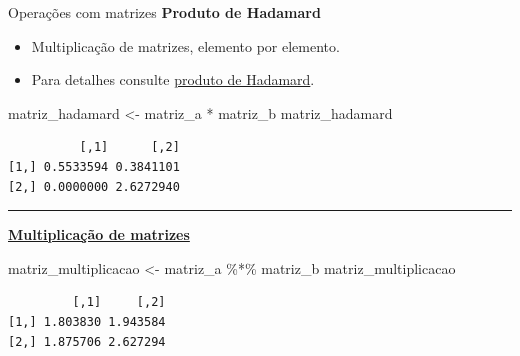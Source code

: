 \documentclass[
  10pt,
  ignorenonframetext,
]{beamer}
\newenvironment{Shaded}{\begin{snugshade}}{\end{snugshade}}
\newcommand{\NormalTok}[1]{\textcolor[rgb]{0.00,0.23,0.31}{#1}}
\newcommand{\OtherTok}[1]{\textcolor[rgb]{0.00,0.23,0.31}{#1}}
\newcommand{\SpecialCharTok}[1]{\textcolor[rgb]{0.37,0.37,0.37}{#1}}
\providecommand{\tightlist}{%
  \setlength{\itemsep}{0pt}\setlength{\parskip}{0pt}}\usepackage{longtable,booktabs,array}
\newcommand*{\regrafina}{\rule{\textwidth}{0.5pt}}
\begin{document}
\begin{frame}[fragile]{Operações com matrizes}
\protect\hypertarget{operauxe7uxf5es-com-matrizes-1}{}
\textbf{Produto de Hadamard}

\begin{itemize}
\tightlist
\item
  Multiplicação de matrizes, elemento por elemento.
\item
  Para detalhes consulte
  \href{https://en.wikipedia.org/wiki/Hadamard_product_(matrices)}{produto
  de Hadamard}.
\end{itemize}

\begin{Shaded}
\begin{Highlighting}[]
\NormalTok{matriz\_hadamard }\OtherTok{\textless{}{-}}\NormalTok{ matriz\_a }\SpecialCharTok{*}\NormalTok{ matriz\_b}
\NormalTok{matriz\_hadamard}
\end{Highlighting}
\end{Shaded}

\begin{verbatim}
          [,1]      [,2]
[1,] 0.5533594 0.3841101
[2,] 0.0000000 2.6272940
\end{verbatim}

\regrafina

\href{https://pt.wikipedia.org/wiki/Matriz_inversa}{\textbf{Multiplicação
de matrizes}}

\begin{Shaded}
\begin{Highlighting}[]
\NormalTok{matriz\_multiplicacao }\OtherTok{\textless{}{-}}\NormalTok{ matriz\_a }\SpecialCharTok{\%*\%}\NormalTok{ matriz\_b}
\NormalTok{matriz\_multiplicacao}
\end{Highlighting}
\end{Shaded}

\begin{verbatim}
         [,1]     [,2]
[1,] 1.803830 1.943584
[2,] 1.875706 2.627294
\end{verbatim}
\end{frame}
\end{document}
